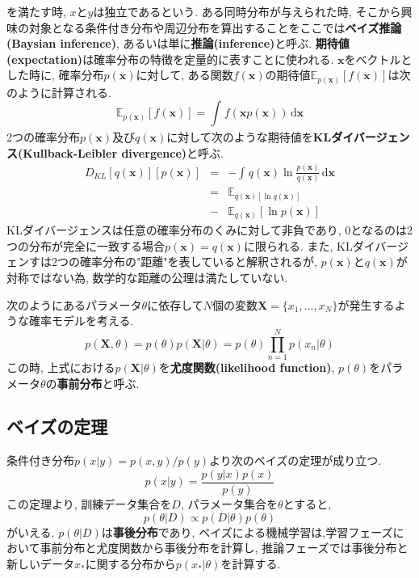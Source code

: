 \documentclass[twocolumn]{jarticle}
\begin{document}
を満たす時, ${x}$と${y}$は独立であるという.
ある同時分布が与えられた時, そこから興味の対象となる条件付き分布や周辺分布を算出することをここでは{\bf ベイズ推論(Baysian inference)}, あるいは単に{\bf 推論(inference)}と呼ぶ.
{\bf 期待値(expectation)}は確率分布の特徴を定量的に表すことに使われる. ${\bm {x}}$をベクトルとした時に, 確率分布${p(\bm {x})}$に対して, ある関数${f(\bm {x})}$の期待値${\mathbb{E}_{p(\bm {x})} [f(\bm {x})]}$は次のように計算される.
\begin{equation}
  \mathbb{E}_{p(\bm {x})} [f(\bm {x})] = \int_{}^{} f(\bm {x}p(\bm {x})) \,\mathrm{d}{\bm x}
\end{equation}
2つの確率分布${p(\bm {x})}$及び${q(\bm {x})}$に対して次のような期待値を{\bf KLダイバージェンス(Kullback-Leibler divergence)}と呼ぶ.
\begin{eqnarray}
  D_{KL}[q(\bm {x})][p(\bm {x})] &=& - \int_{}^{} q(\bm {x}) \ln \frac{p(\bm {x})}{q(\bm {x})}  \,\mathrm{d}{\bm {x}} \nonumber \\
  &=& \mathbb{E}_{q(\bm {x})[\ln q(\bm {x})]} \nonumber \\
  &-& \mathbb{E}_{q(\bm {x})}[\ln p(\bm {x})]
\end{eqnarray}
KLダイバージェンスは任意の確率分布のくみに対して非負であり, 0となるのは2つの分布が完全に一致する場合${p(\bm {x}) = q(\bm {x})}$に限られる. また, KLダイバージェンすは2つの確率分布の"距離"を表していると解釈されるが, ${p(\bm {x})}$と${q(\bm {x})}$が対称ではない為, 数学的な距離の公理は満たしていない.

次のようにあるパラメータ${\theta }$に依存して${N}$個の変数${\bm {X} = \{x_1, \ldots, x_N\}}$が発生するような確率モデルを考える.
\begin{equation}
  p(\bm {X}, \theta) = p(\theta)p(\bm {X}|\theta) = p(\theta)\prod_{n=1}^N p(x_n|\theta)
\end{equation}
この時, 上式における${p(\bm {X}|\theta)}$を{\bf 尤度関数(likelihood function)}, ${p(\theta)}$をパラメータ${\theta}$の{\bf 事前分布}と呼ぶ.

\subsection{ベイズの定理}
条件付き分布${p(x|y) = p(x, y)/p(y)}$より次のベイズの定理が成り立つ.
\begin{equation}
  p(x|y) = \frac{p(y|x)p(x)}{p(y)}
\end{equation}
この定理より, 訓練データ集合を${D}$, パラメータ集合を${\theta}$とすると,
\begin{equation}
  p(\theta|D) \varpropto p(D|\theta)p(\theta)
\end{equation}
がいえる. ${p(\theta|D)}$は{\bf 事後分布}であり, ベイズによる機械学習は,学習フェーズにおいて事前分布と尤度関数から事後分布を計算し, 推論フェーズでは事後分布と新しいデータ${x_\ast}$に関する分布から${p(x_\ast|\theta)}$を計算する.
\end{document}
